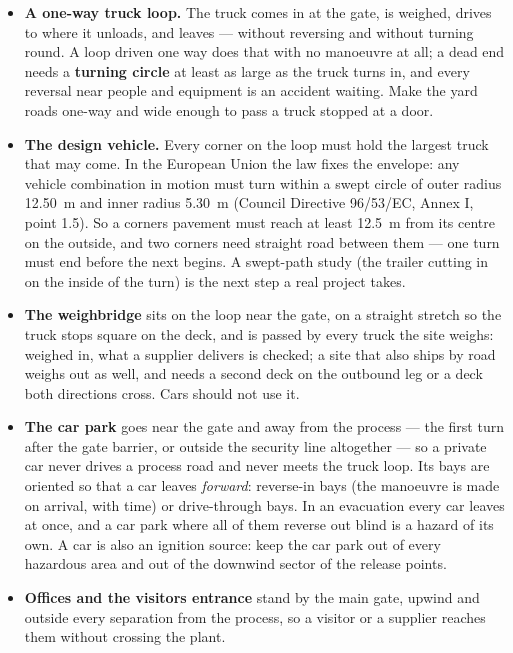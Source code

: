 \documentclass[11pt,a4paper]{article}
\providecommand{\tightlist}{\setlength{\itemsep}{0pt}\setlength{\parskip}{0pt}}
\begin{document}
\begin{itemize}
\tightlist
\item
  \textbf{A one-way truck loop.} The truck comes in at the gate, is
  weighed, drives to where it unloads, and leaves --- without reversing
  and without turning round. A loop driven one way does that with no
  manoeuvre at all; a dead end needs a \textbf{turning circle} at least
  as large as the truck turns in, and every reversal near people and
  equipment is an accident waiting. Make the yard roads one-way and
  wide enough to pass a truck stopped at a door.
\item
  \textbf{The design vehicle.} Every corner on the loop must hold the
  largest truck that may come. In the European Union the law fixes the
  envelope: any vehicle combination in motion must turn within a swept
  circle of outer radius 12.50~m and inner radius 5.30~m (Council
  Directive 96/53/EC, Annex I, point 1.5). So a corner\textquotesingle s
  pavement must reach at least 12.5~m from its centre on the outside,
  and two corners need straight road between them --- one turn must
  end before the next begins. A swept-path study (the trailer cutting
  in on the inside of the turn) is the next step a real project takes.
\item
  \textbf{The weighbridge} sits on the loop near the gate, on a
  straight stretch so the truck stops square on the deck, and is
  passed by every truck the site weighs: weighed in, what a supplier
  delivers is checked; a site that also ships by road weighs out as
  well, and needs a second deck on the outbound leg or a deck both
  directions cross. Cars should not use it.
\item
  \textbf{The car park} goes near the gate and away from the process ---
  the first turn after the gate barrier, or outside the security line
  altogether --- so a private car never drives a process road and never
  meets the truck loop. Its bays are oriented so that a car leaves
  \emph{forward}: reverse-in bays (the manoeuvre is made on arrival,
  with time) or drive-through bays. In an evacuation every car leaves at
  once, and a car park where all of them reverse out blind is a hazard
  of its own. A car is also an ignition source: keep the car park out of
  every hazardous area and out of the downwind sector of the release
  points.
\item
  \textbf{Offices and the visitors\textquotesingle{} entrance} stand by
  the main gate, upwind and outside every separation from the process,
  so a visitor or a supplier reaches them without crossing the plant.

\end{itemize}
\end{document}
